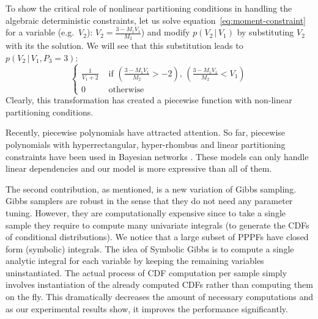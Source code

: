 \documentclass[letterpaper]{article}
\newcommand{\case}[2]{#2 &\text{ if } #1}%
\newcommand{\otherwise}[1]{#1 &\text{ otherwise}}
\newcommand{\pr}{p}
\begin{document}
To show the critical role of nonlinear partitioning conditions in handling the algebraic deterministic constraints, 
let us solve equation~\ref{eq:moment-constraint} for a variable (e.g.\ $V_2$):
$V_2 = \frac{3 - M_1 V_1}{M_2}$) and modify $\pr(V_2 \,|\, V_1)$ by substituting $V_2$ with its the solution.
We will see that this substitution leads to $\pr(V_2 \,|\, V_1, P_3 = 3)$:
\begin{equation}
\label{e:fractional-constraint}
\begin{cases}
  \case{(\frac{3 - M_1 V_1}{M_2} > -2) , \, (\frac{3 - M_1 V_1}{M_2} < V_1)}{\frac{1}{V_1 +2}}\\
  \otherwise{0}
  \end{cases}
\end{equation}
Clearly, this transformation has created a piecewise function with non-linear partitioning conditions.

Recently, piecewise polynomials have attracted attention.
So far, piecewise polynomials with hyperrectangular, hyper-rhombus and linear partitioning constraints have been used in Bayesian networks \cite{shenoy2011inference,shenoy2012two,Sanner:12}.
These models can only handle linear dependencies and 
our model is more expressive than all of them. 

The second contribution, as mentioned, is a new variation of Gibbs sampling.  
Gibbs samplers are robust in the sense that they do not need any parameter tuning.
However, they are computationally expensive since to take a single sample they require to compute many univariate integrals (to generate the CDFs of conditional distributions).
We notice that a large subset of PPPFs have closed form (symbolic) integrals. 
The idea of Symbolic Gibbs is to compute a single analytic integral for each variable by keeping the remaining variables uninstantiated. 
The actual process of CDF computation per sample  
simply involves instantiation of the already computed CDFs rather than computing them on the fly.
This dramatically decreases the amount of necessary computations and as our experimental results show, it improves the performance significantly.
\end{document}

